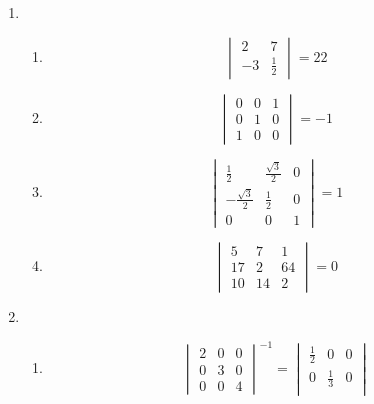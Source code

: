 \documentclass[a4paper]{article}
\begin{document}
\begin{enumerate}
	\item
	\begin{enumerate}
		\item
			\begin{equation*}
				\begin{vmatrix}
					2 & 7\\
					-3 & \frac{1}{2}
				\end{vmatrix}
				=
				22
			\end{equation*}
		\item
			\begin{equation*}
				\begin{vmatrix}
					0 & 0 & 1\\
					0 & 1 & 0\\
					1 & 0 & 0
				\end{vmatrix}
				=
				-1
			\end{equation*}
		\item
			\begin{equation*}
				\begin{vmatrix}
					\frac{1}{2} & \frac{\sqrt{3}}{2} & 0\\
					-\frac{\sqrt{3}}{2} & \frac{1}{2} & 0\\
					0 & 0 & 1
				\end{vmatrix}
				=
				1
			\end{equation*}
		\item
			\begin{equation*}
				\begin{vmatrix}
					5 & 7 & 1\\
					17 & 2 & 64\\
					10 & 14 & 2
				\end{vmatrix}
				=
				0
			\end{equation*}
	\end{enumerate}
\item
	\begin{enumerate}
		\item
			\begin{equation*}
				\begin{vmatrix}
					2 & 0 & 0\\
					0 & 3 & 0\\
					0 & 0 & 4
				\end{vmatrix}^{-1}
				=
				\begin{vmatrix}
					\frac{1}{2} & 0 & 0\\
					0 & \frac{1}{3} & 0\\

\end{vmatrix}
\end{equation*}
\end{enumerate}
\end{enumerate}
\end{document}
